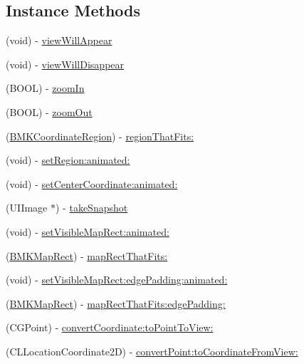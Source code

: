 \subsection*{Instance Methods}
\begin{DoxyCompactItemize}
\item 
(void) -\/ \hyperlink{interface_b_m_k_map_view_a6ce8ac560bd901b93b3e15d6996a409a}{view\+Will\+Appear}
\item 
(void) -\/ \hyperlink{interface_b_m_k_map_view_a0cfbfc217062e84de41ddb04dcad7e67}{view\+Will\+Disappear}
\item 
(B\+O\+O\+L) -\/ \hyperlink{interface_b_m_k_map_view_a349f7c74871a389d73955edd7bcd9fdf}{zoom\+In}
\item 
(B\+O\+O\+L) -\/ \hyperlink{interface_b_m_k_map_view_a1806c818757917ef674ebe5ba24fe5a2}{zoom\+Out}
\item 
(\hyperlink{struct_b_m_k_coordinate_region}{B\+M\+K\+Coordinate\+Region}) -\/ \hyperlink{interface_b_m_k_map_view_a5a1387f64868bf341cbf743063a91d28}{region\+That\+Fits\+:}
\item 
(void) -\/ \hyperlink{interface_b_m_k_map_view_af182240990fe7ad8ff8b709456200fed}{set\+Region\+:animated\+:}
\item 
(void) -\/ \hyperlink{interface_b_m_k_map_view_a02c0933bb56354f30695a6634e416e26}{set\+Center\+Coordinate\+:animated\+:}
\item 
(U\+I\+Image $\ast$) -\/ \hyperlink{interface_b_m_k_map_view_af2af641b86f327aa9f2a16050d380db2}{take\+Snapshot}
\item 
(void) -\/ \hyperlink{interface_b_m_k_map_view_ad90d3e9ceabed218dcb90d9fc8247902}{set\+Visible\+Map\+Rect\+:animated\+:}
\item 
(\hyperlink{struct_b_m_k_map_rect}{B\+M\+K\+Map\+Rect}) -\/ \hyperlink{interface_b_m_k_map_view_a58f9c0d783d39cd0d028ae94ca408de8}{map\+Rect\+That\+Fits\+:}
\item 
(void) -\/ \hyperlink{interface_b_m_k_map_view_a1e5a69629b90ac2f571284e2e6c32397}{set\+Visible\+Map\+Rect\+:edge\+Padding\+:animated\+:}
\item 
(\hyperlink{struct_b_m_k_map_rect}{B\+M\+K\+Map\+Rect}) -\/ \hyperlink{interface_b_m_k_map_view_a93e07fbbe602a9a493650158babd2349}{map\+Rect\+That\+Fits\+:edge\+Padding\+:}
\item 
(C\+G\+Point) -\/ \hyperlink{interface_b_m_k_map_view_a46ec1b9f485f41a04ffe76300624f5b4}{convert\+Coordinate\+:to\+Point\+To\+View\+:}
\item 
(C\+L\+Location\+Coordinate2\+D) -\/ \hyperlink{interface_b_m_k_map_view_a6ab0dbfdf28bf2ab29174d9a70ce2e9c}{convert\+Point\+:to\+Coordinate\+From\+View\+:}

\end{DoxyCompactItemize}
